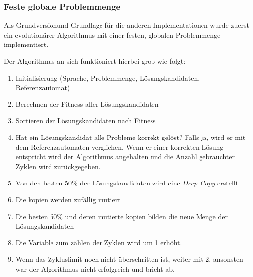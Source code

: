 \subsubsection{Feste globale Problemmenge}
Als \flqq Grundversion\frqq und Grundlage für die anderen Implementationen wurde zuerst ein evolutionärer Algorithmus mit einer festen, globalen Problemmenge implementiert.

Der Algorithmus an sich funktioniert hierbei grob wie folgt: 
\begin{enumerate}
\item Initialisierung (Sprache, Problemmenge, Lösungskandidaten, Referenzautomat)
\item Berechnen der Fitness aller Lösungskandidaten
\item Sortieren der Lösungskandidaten nach Fitness
\item Hat ein Lösungskandidat alle Probleme korrekt gelöst? Falls ja, wird er mit dem Referenzautomaten verglichen. Wenn er einer korrekten Lösung entspricht wird der Algorithmus angehalten und die Anzahl gebrauchter Zyklen wird zurückgegeben.
\item Von den besten 50\% der Lösungskandidaten wird eine \textit{Deep Copy} erstellt
\item Die kopien werden zufällig mutiert
\item Die besten 50\% und deren mutierte kopien bilden die neue Menge der Lösungskandidaten
\item Die Variable zum zählen der Zyklen wird um 1 erhöht.
\item Wenn das Zykluslimit noch nicht überschritten ist, weiter mit 2. ansonsten war der Algorithmus nicht erfolgreich und bricht ab.
\end{enumerate}